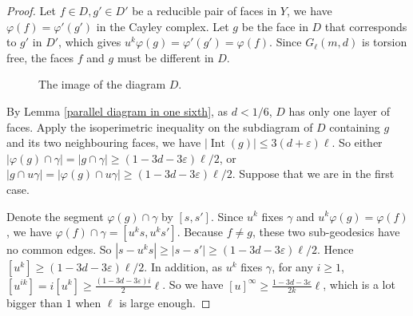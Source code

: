 \documentclass[a4paper]{article}
\DeclareMathOperator{\Int}{Int}
\theoremstyle{remark}
\begin{document}
\begin{proof}
    Let $f\in D, g'\in D'$ be a reducible pair of faces in $Y$, we have $\varphi(f) = \varphi'(g')$ in the Cayley complex. Let $g$ be the face in $D$ that corresponds to $g'$ in $D'$, which gives $u^k\varphi(g) = \varphi'(g') = \varphi(f)$. Since $G_\ell(m,d)$ is torsion free, the faces $f$ and $g$ must be different in $D$.
    
    \begin{figure}[h]
\begin{center}
\end{center}
    \caption{The image of the diagram $D$.}
\end{figure}

    By Lemma \ref{parallel diagram in one sixth}, as $d<1/6$, $D$ has only one layer of faces. Apply the isoperimetric inequality on the subdiagram of $D$ containing $g$ and its two neighbouring faces, we have $|\Int(g)|\leq 3(d+\varepsilon)\ell$. So either $|\varphi(g)\cap \gamma| = |g\cap \gamma|\geq(1-3d-3\varepsilon)\ell/2$, or $|g\cap u\gamma| = |\varphi(g)\cap u\gamma|\geq(1-3d-3\varepsilon)\ell/2$. Suppose that we are in the first case.
    
    Denote the segment $\varphi(g)\cap \gamma$ by $[s, s']$. Since $u^k$ fixes $\gamma$ and $u^k\varphi(g)= \varphi(f)$, we have $\varphi(f)\cap \gamma = [u^ks,u^ks']$. Because $f\neq g$, these two sub-geodesics have no common edges. So $|s-u^ks|\geq |s-s'|\geq (1-3d-3\varepsilon)\ell/2$. Hence $[u^k]\geq (1-3d-3\varepsilon)\ell/2$. In addition, as $u^k$ fixes $\gamma$, for any $i\geq 1$, $[u^{ik}] = i[u^{k}]\geq \frac{(1-3d-3\varepsilon)i}{2}\ell$. So we have $[u]^\infty \geq \frac{1-3d-3\varepsilon}{2k}\ell$, which is a lot bigger than $1$ when $\ell$ is large enough.
\end{proof}
\end{document}
